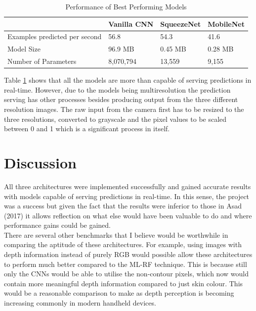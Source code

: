 \documentclass{article}
\begin{document}
\begin{table}[h!]
  \begin{center}
    \caption{Performance of Best Performing Models}
    \label{tab:speed}
    \begin{tabular}{l|l|l|l}
      \textbf{} & \textbf{Vanilla CNN} &  \textbf{SqueezeNet} & \textbf{MobileNet}  \\
      \hline
      Examples predicted per second & 56.8 & 54.3 & 41.6 \\
      Model Size & 96.9 MB  & 0.45 MB & 0.28 MB \\
      Number of Parameters & 8,070,794 & 13,559 & 9,155\\
    \end{tabular}
  \end{center}
\end{table}

Table \ref{tab:speed} shows that all the models are more than capable of serving predictions in real-time. However, due to the models being multiresolution the prediction serving has other processes besides producing output from the three different resolution images. The raw input from the camera first has to be resized to the three resolutions, converted to grayscale and the pixel values to be scaled between 0 and 1 which is a significant process in itself.


\section{Discussion}
All three architectures were implemented successfully and gained accurate results with models capable of serving predictions in real-time. In this sense, the project was a success but given the fact that the results were inferior to those in Asad (2017) it allows reflection on what else would have been valuable to do and where performance gains could be gained. \\

There are several other benchmarks that I believe would be worthwhile in comparing the aptitude of these architectures. For example, using images with depth information instead of purely RGB would possible allow these architectures to perform much better compared to the ML-RF technique. This is because still only the CNNs would be able to utilise the non-contour pixels, which now would contain more meaningful depth information compared to just skin colour. This would be a reasonable comparison to make as depth perception is becoming increasing commonly in modern handheld devices. \\
\end{document}
